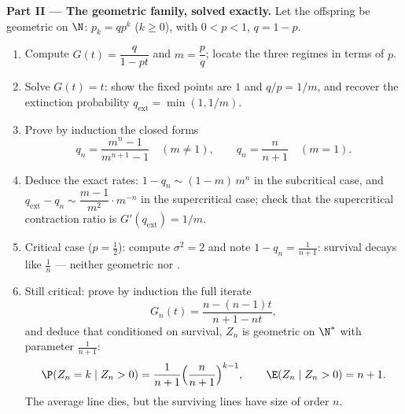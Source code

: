 \begin{problem}
\medskip
\noindent\textbf{Part II --- The geometric family, solved
exactly.} Let the offspring  be geometric on $\N$: $p_k =
qp^k$ ($k \geq 0$), with $0 < p < 1$, $q = 1 - p$.
\begin{enumerate}[resume]
  \item Compute $G(t) = \dfrac{q}{1 - pt}$ and $m = \dfrac
        pq$; locate the three regimes in terms of $p$.
  \item Solve $G(t) = t$: show the fixed points are $1$ and
        $q/p = 1/m$, and recover the extinction probability
        $q_{\mathrm{ext}} = \min(1, 1/m)$.
  \item Prove by induction the closed forms
        \[
        q_n = \frac{m^n - 1}{m^{n+1} - 1} \quad (m \neq 1),
        \qquad
        q_n = \frac{n}{n+1} \quad (m = 1).
        \]
  \item Deduce the exact rates: $1 - q_n \sim (1 - m)\,m^n$
        in the subcritical case, and $q_{\mathrm{ext}} - q_n
        \sim \dfrac{m - 1}{m^{2}}\cdot m^{-n}$ in the
        supercritical case; check that the supercritical
        contraction ratio is $G'(q_{\mathrm{ext}}) = 1/m$.
  \item Critical case ($p = \tfrac12$): compute $\sigma^2 =
        2$ and note $1 - q_n = \frac1{n+1}$: survival decays
        like $\frac1n$ --- neither geometric nor .
  \item Still critical: prove by induction the full iterate
        \[
        G_n(t) = \frac{n - (n-1)t}{n + 1 - nt},
        \]
        and deduce that conditioned on survival, $Z_n$ is
        geometric on $\N^*$ with parameter $\frac1{n+1}$:
        \[
        \P(Z_n = k \mid Z_n > 0) = \frac1{n+1}
        \Bigl(\frac{n}{n+1}\Bigr)^{k-1},
        \qquad
        \E(Z_n \mid Z_n > 0) = n + 1 .
        \]
        The average line dies, but the surviving lines have
        size of order $n$.
\end{enumerate}


\end{problem}
